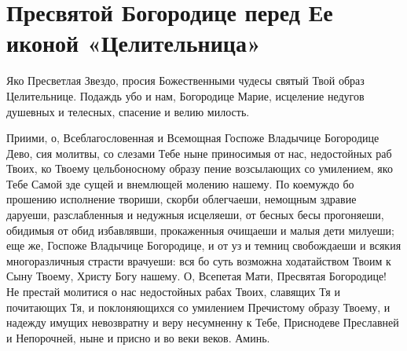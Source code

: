 \section{Пресвятой Богородице перед Ее иконой «Целительница»}\begin{mymulticols}




Яко Пресветлая Звездо, просия Божественными чудесы святый Твой образ Целительнице. Подаждь убо и нам, Богородице Марие, исцеление недугов душевных и телесных, спасение и велию милость.




Приими, о, Всеблагословенная и Всемощная Госпоже Владычице Богородице Дево, сия молитвы, со слезами Тебе ныне приносимыя от нас, недостойных раб Твоих, ко Твоему цельбоносному образу пение возсылающих со умилением, яко Тебе Самой зде сущей и внемлющей молению нашему. По коемуждо бо прошению исполнение твориши, скорби облегчаеши, немощным здравие даруеши, разслабленныя и недужныя исцеляеши, от бесных бесы прогоняеши, обидимыя от обид избавлявши, прокаженныя очищаеши и малыя дети милуеши; еще же, Госпоже Владычице Богородице, и от уз и темниц свобождаеши и всякия многоразличныя страсти врачуеши: вся бо суть возможна ходатайством Твоим к Сыну Твоему, Христу Богу нашему. О, Всепетая Мати, Пресвятая Богородице! Не престай молитися о нас недостойных рабах Твоих, славящих Тя и почитающих Тя, и поклоняющихся со умилением Пречистому образу Твоему, и надежду имущих невозвратну и веру несумненну к Тебе, Приснодеве Преславней и Непорочней, ныне и присно и во веки веков. Аминь.


\end{mymulticols}

